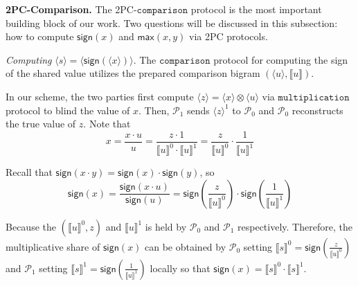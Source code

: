 \documentclass[letterpaper]{article} %
\begin{document}
    \textbf{2PC-Comparison.}
    The 2PC-$\mathtt{comparison}$ protocol is the most important building block of our work.
    Two questions will be discussed in this subsection:
    how to compute $\mathsf{sign}(x)$ and $\mathsf{max}(x,y)$ via 2PC protocols.


    \emph{Computing} $\langle s\rangle  = \langle \mathsf{sign}(\langle x\rangle)\rangle $.
    The $\mathtt{comparison}$ protocol for computing the sign of the shared value utilizes the
    prepared comparison bigram $(\langle u\rangle,\llbracket u \rrbracket )$.

    In our scheme, the two parties first compute $ \langle z\rangle = \langle x\rangle\otimes \langle u\rangle$
    via $\mathtt{multiplication}$ protocol
    to blind the value of $x$.
    Then, $\mathcal{P}_{1}$ sends  $ \langle z\rangle^{1}$ to $\mathcal{P}_{0}$ and
    $\mathcal{P}_{0}$ reconstructs the true value of $z$.
    Note that
    $$x=\frac{x\cdot u}{u}
        =\frac{z\cdot 1}{\llbracket u \rrbracket^{0}\cdot \llbracket u \rrbracket^{1}}
        =\frac{z}{\llbracket u \rrbracket^{0}}\cdot\frac{1}{\llbracket u \rrbracket^{1}}$$

    Recall that $\mathsf{sign}(x\cdot y)=\mathsf{sign}(x)\cdot \mathsf{sign}(y)$, so
    $$\mathsf{sign}(x)=\frac{\mathsf{sign}(x \cdot u)}{\mathsf{sign}(u)}
    =\mathsf{sign}(\frac{z}{\llbracket u \rrbracket^{0}})
    \cdot \mathsf{sign}(\frac{1}{\llbracket u \rrbracket^{1}})$$

    Because the $(\llbracket u \rrbracket^{0},z)$ and $\llbracket u \rrbracket^{1}$
    is held by $\mathcal{P}_{0}$ and $\mathcal{P}_{1}$ respectively.
    Therefore, the multiplicative share of $\mathsf{sign}(x)$ can be obtained by
    $\mathcal{P}_{0}$ setting $\llbracket s \rrbracket^{0}
    =\mathsf{sign}(\frac{z}{\llbracket u \rrbracket^{0}})$
    and $\mathcal{P}_{1}$ setting $\llbracket s \rrbracket^{1}
    =\mathsf{sign}(\frac{1}{\llbracket u \rrbracket^{1}})$ locally
    so that $\mathsf{sign}(x)=\llbracket s \rrbracket^{0}\cdot \llbracket s \rrbracket^{1}$.
\end{document}
